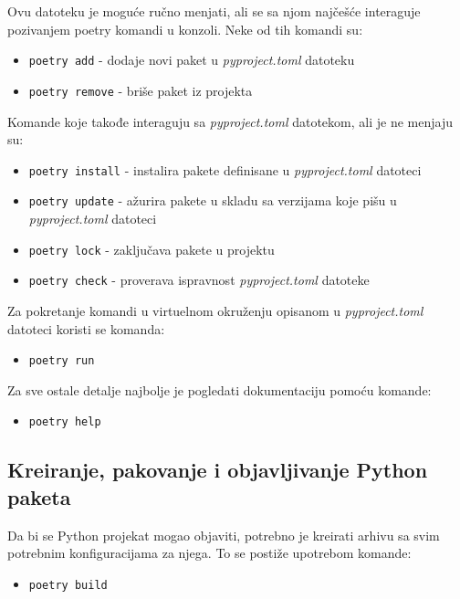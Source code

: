 \documentclass[12pt]{report}
\begin{document}
Ovu datoteku je moguće ručno menjati, ali se sa njom najčešće interaguje pozivanjem poetry komandi u konzoli. Neke od tih komandi su:

\begin{itemize}
    \item \texttt{poetry add} - dodaje novi paket u \textit{pyproject.toml} datoteku
    \item \texttt{poetry remove} - briše paket iz projekta
\end{itemize}

Komande koje takođe interaguju sa \textit{pyproject.toml} datotekom, ali je ne menjaju su:

\begin{itemize}
    \item \texttt{poetry install} - instalira pakete definisane u \textit{pyproject.toml} datoteci
    \item \texttt{poetry update} - ažurira pakete u skladu sa verzijama koje pišu u \textit{pyproject.toml} datoteci
    \item \texttt{poetry lock} - zaključava pakete u projektu
    \item \texttt{poetry check} - proverava ispravnost \textit{pyproject.toml} datoteke
\end{itemize}

Za pokretanje komandi u virtuelnom okruženju opisanom u \textit{pyproject.toml} datoteci koristi se komanda:

\begin{itemize}
    \item \texttt{poetry run}
\end{itemize}

Za sve ostale detalje najbolje je pogledati dokumentaciju pomoću komande:

\begin{itemize}
    \item \texttt{poetry help}
\end{itemize}

\subsection{Kreiranje, pakovanje i objavljivanje Python paketa}
Da bi se Python projekat mogao objaviti, potrebno je kreirati arhivu sa svim potrebnim konfiguracijama za njega. To se postiže upotrebom komande:

\begin{itemize}
    \item \texttt{poetry build}
\end{itemize}
\end{document}
